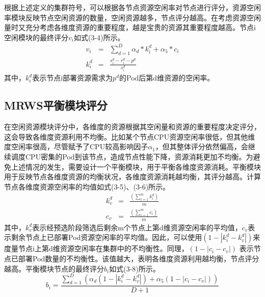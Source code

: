 根据上述定义的集群符号，可以根据各节点资源空闲率对节点进行评分，资源空闲率模块反映节点空闲资源的数量，空闲资源越多，节点评分越高。在考虑资源空闲量时又充分考虑各维度资源的重要程度，越是宝贵的资源其重要程度越高。节点i空闲模块的最终评分$v_{i}$如式(3-4)所示。
\begin{eqnarray}
v_{i} & = & \sum_{d=1}^{D}\alpha_{d}*k_{i}^{d}+\alpha_{5}*c_{i} \\[0.3cm]
k_{i}^{d} & = & \frac{s_{i}^{d}-r_{i}^{d}-p^{d}}{s_{i}^{d}}
\end{eqnarray}
其中，$k_{i}^{d}$表示节点i部署资源需求为$p^{d}$的Pod后第d维资源的空闲率。

\subsection{MRWS平衡模块评分}
在空闲资源模块评分中，各维度的资源根据其空闲量和资源的重要程度决定评分，这会导致各维度资源利用不均衡。比如某个节点CPU资源空闲率很低，但其他维度空闲率很高，尽管赋予了CPU较高影响因子\begin{math}\alpha_{1}\end{math}，但其整体评分依然偏高，会继续调度CPU密集的Pod到该节点，造成节点性能下降，资源消耗更加不均衡。为避免上述情况的发生，需要设计一个平衡模块，用于平衡各维度资源消耗。平衡模块用于反映节点各维度资源的均衡状况，各维度资源消耗越均衡，其评分越高。计算节点各维度资源空闲率的均值如式(3-5)、(3-6)所示。
\begin{eqnarray}
k_{v}^{d} &=& \frac{(\sum_{i=1}^{m}k_{i}^{d})}{m} \\[0.3cm]
c_{v} &=& \frac{(\sum_{i=1}^{m}c_{i})}{m}
\end{eqnarray}
其中，\begin{math}k_{v}^{d}\end{math}表示经预选阶段筛选后剩余m个节点上第d维资源空闲率的平均值，\begin{math}c_{v}\end{math}表示剩余节点上已部署Pod资源空闲率的平均值。因此，可以使用\begin{math}(1-\left |k_{i}^{d}-k_{v}^{d}\right |)\end{math}来度量节点i上第d维资源空闲率在集群中的不均衡性。同理，\begin{math}(1-\left |c_{i}-c_{v}\right|)\end{math}
表示节点已部署Pod数量的不均衡性。该值越大，表明各维度资源利用越均衡，节点评分越高。平衡模块节点的最终评分\begin{math}b_{i}\end{math}如式(3-8)所示。
\begin{equation}
b_{i} = \frac{\sum_{d=1}^{D}(\alpha_{d}(1-\left |k_{i}^{d}-k_{v}^{d}\right|)+\alpha_{5}(1-\left |c_{i}-c_{v}\right|))}{D+1}
\end{equation}

